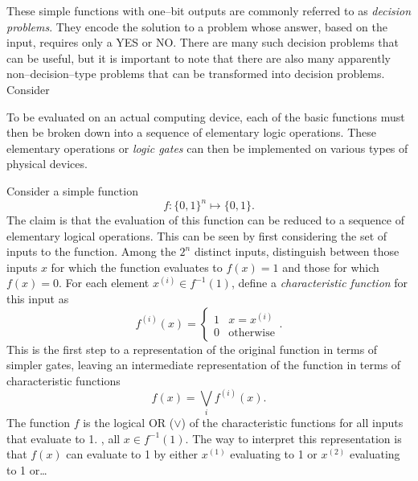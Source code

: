 These simple functions with one--bit outputs are commonly
referred to as \emph{decision problems}.
They encode the solution to a problem whose answer, based on
the input, requires only a YES or NO.  There are many such
decision problems that can be useful, but it is important to note
that there are also many apparently non--decision--type problems 
that can be transformed into decision problems.  Consider

To be evaluated on an actual computing device,
each of the basic functions must then be broken down into a 
sequence
of elementary logic operations.  These elementary operations
or {\sl logic gates} 
can then be implemented on various types 
of physical devices.

Consider a simple function
\begin{equation}
f\colon\lbrace 0,1\rbrace^n \mapsto \lbrace 0,1\rbrace.
\end{equation}
The claim is that the evaluation of this function can be
reduced to a sequence of elementary logical operations.
This can be seen by first considering the set of inputs
to the function.  Among the $2^n$ distinct inputs, distinguish
between those inputs $x$ for which the function evaluates to 
$f(x)=1$ and those for which $f(x)=0$.  
For each element
$x^{(i)}\in f^{-1}(1)$, define a {\sl characteristic function}
for this input as
\begin{equation}
f^{(i)}(x) = \begin{cases}
                1&x=x^{(i)}\\
                0&\text{otherwise}
             \end{cases}.
\end{equation}
This is the first step to a representation of the original function
in terms of simpler gates,  leaving an intermediate representation
of the function in terms of characteristic functions
\begin{equation}
f(x) = \bigvee_i f^{(i)}(x).
\end{equation}
The function $f$ is the logical OR ($\vee$) of the characteristic functions
for all inputs that evaluate to 1. \ie, all $x\in f^{-1}(1)$.
The way to interpret this representation is that $f(x)$ can evaluate
to 1 by either $x^{(1)}$ evaluating to 1 or $x^{(2)}$ evaluating to 1 
or\dots

